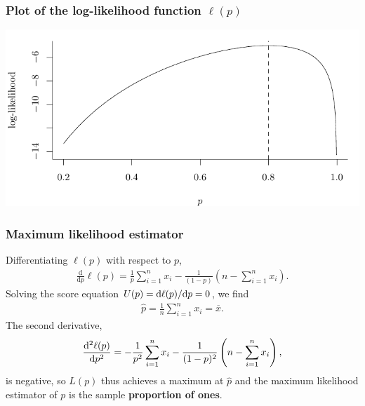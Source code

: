 \documentclass{beamer}
\begin{document}
\begin{frame}
\frametitle{Plot of the log-likelihood function $\ell(p)$}

\begin{center}
\includegraphics[width = \linewidth]{img/c3/05-loglikelihood.pdf}
\end{center}
\end{frame}

\begin{frame}
\frametitle{Maximum likelihood estimator}
Differentiating $\ell( p)$ with respect to $p$,
\begin{align*}
\frac{\mathrm{d}}{\mathrm{d}p} \ell(p)=\frac{1}{p} \sum_{i=1}^n x_i-\frac{1}{(1-p)}\left(n-\sum_{i=1}^n x_i \right).
\end{align*}
Solving the score equation $U(p)=\mathrm{d} \ell(p)/\mathrm{d} p
 =0$, we find
\begin{align*}
\widehat{p}=\frac{1}{n} \sum_{i=1}^n x_i = \overline{x}.
\end{align*}
The second derivative,
\begin{align*}
  \frac{\mathrm{d}^2 \ell(p)}{\mathrm{d} p^2} = -\frac{1}{p^2} \sum_{i=1}^n x_i-\frac{1}{(1-p)^2}\left(n-\sum_{i=1}^n x_i \right),
\end{align*}
is negative, so $L(p)$ thus achieves a maximum at $\widehat{p}$ and the maximum likelihood estimator of $p$ is the sample \textbf{proportion of ones}.

\end{frame}
\end{document}

